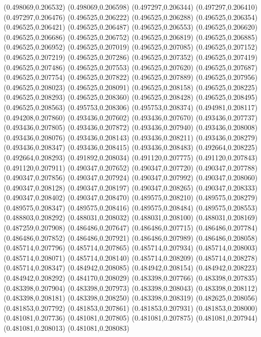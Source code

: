 (0.498069,0.206532)
(0.498069,0.206598)
(0.497297,0.206344)
(0.497297,0.206410)
(0.497297,0.206476)
(0.496525,0.206222)
(0.496525,0.206288)
(0.496525,0.206354)
(0.496525,0.206421)
(0.496525,0.206487)
(0.496525,0.206553)
(0.496525,0.206620)
(0.496525,0.206686)
(0.496525,0.206752)
(0.496525,0.206819)
(0.496525,0.206885)
(0.496525,0.206952)
(0.496525,0.207019)
(0.496525,0.207085)
(0.496525,0.207152)
(0.496525,0.207219)
(0.496525,0.207286)
(0.496525,0.207352)
(0.496525,0.207419)
(0.496525,0.207486)
(0.496525,0.207553)
(0.496525,0.207620)
(0.496525,0.207687)
(0.496525,0.207754)
(0.496525,0.207822)
(0.496525,0.207889)
(0.496525,0.207956)
(0.496525,0.208023)
(0.496525,0.208091)
(0.496525,0.208158)
(0.496525,0.208225)
(0.496525,0.208293)
(0.496525,0.208360)
(0.496525,0.208428)
(0.496525,0.208495)
(0.496525,0.208563)
(0.495753,0.208306)
(0.495753,0.208374)
(0.494981,0.208117)
(0.494208,0.207860)
(0.493436,0.207602)
(0.493436,0.207670)
(0.493436,0.207737)
(0.493436,0.207805)
(0.493436,0.207872)
(0.493436,0.207940)
(0.493436,0.208008)
(0.493436,0.208076)
(0.493436,0.208143)
(0.493436,0.208211)
(0.493436,0.208279)
(0.493436,0.208347)
(0.493436,0.208415)
(0.493436,0.208483)
(0.492664,0.208225)
(0.492664,0.208293)
(0.491892,0.208034)
(0.491120,0.207775)
(0.491120,0.207843)
(0.491120,0.207911)
(0.490347,0.207652)
(0.490347,0.207720)
(0.490347,0.207788)
(0.490347,0.207856)
(0.490347,0.207924)
(0.490347,0.207992)
(0.490347,0.208060)
(0.490347,0.208128)
(0.490347,0.208197)
(0.490347,0.208265)
(0.490347,0.208333)
(0.490347,0.208402)
(0.490347,0.208470)
(0.489575,0.208210)
(0.489575,0.208279)
(0.489575,0.208347)
(0.489575,0.208416)
(0.489575,0.208484)
(0.489575,0.208553)
(0.488803,0.208292)
(0.488031,0.208032)
(0.488031,0.208100)
(0.488031,0.208169)
(0.487259,0.207908)
(0.486486,0.207647)
(0.486486,0.207715)
(0.486486,0.207784)
(0.486486,0.207852)
(0.486486,0.207921)
(0.486486,0.207989)
(0.486486,0.208058)
(0.485714,0.207796)
(0.485714,0.207865)
(0.485714,0.207934)
(0.485714,0.208003)
(0.485714,0.208071)
(0.485714,0.208140)
(0.485714,0.208209)
(0.485714,0.208278)
(0.485714,0.208347)
(0.484942,0.208085)
(0.484942,0.208154)
(0.484942,0.208223)
(0.484942,0.208292)
(0.484170,0.208029)
(0.483398,0.207766)
(0.483398,0.207835)
(0.483398,0.207904)
(0.483398,0.207973)
(0.483398,0.208043)
(0.483398,0.208112)
(0.483398,0.208181)
(0.483398,0.208250)
(0.483398,0.208319)
(0.482625,0.208056)
(0.481853,0.207792)
(0.481853,0.207861)
(0.481853,0.207931)
(0.481853,0.208000)
(0.481081,0.207736)
(0.481081,0.207805)
(0.481081,0.207875)
(0.481081,0.207944)
(0.481081,0.208013)
(0.481081,0.208083)
